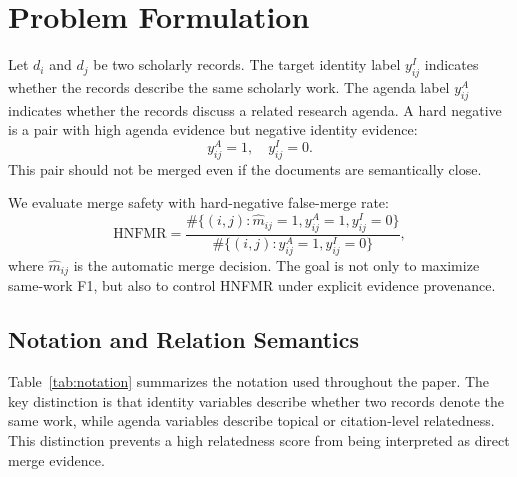 \documentclass[preprint,12pt]{elsarticle}
\begin{document}
\section{Problem Formulation}

Let $d_i$ and $d_j$ be two scholarly records. The target identity label $y^{I}_{ij}$ indicates whether the records describe the same scholarly work. The agenda label $y^{A}_{ij}$ indicates whether the records discuss a related research agenda. A hard negative is a pair with high agenda evidence but negative identity evidence:
\[
y^{A}_{ij}=1,\quad y^{I}_{ij}=0.
\]
This pair should not be merged even if the documents are semantically close.

We evaluate merge safety with hard-negative false-merge rate:
\[
\mathrm{HNFMR} = \frac{\#\{(i,j): \hat{m}_{ij}=1, y^{A}_{ij}=1, y^{I}_{ij}=0\}}{\#\{(i,j): y^{A}_{ij}=1, y^{I}_{ij}=0\}},
\]
where $\hat{m}_{ij}$ is the automatic merge decision. The goal is not only to maximize same-work F1, but also to control HNFMR under explicit evidence provenance.

\subsection{Notation and Relation Semantics}

Table~\ref{tab:notation} summarizes the notation used throughout the paper. The key distinction is that identity variables describe whether two records denote the same work, while agenda variables describe topical or citation-level relatedness. This distinction prevents a high relatedness score from being interpreted as direct merge evidence.
\end{document}
